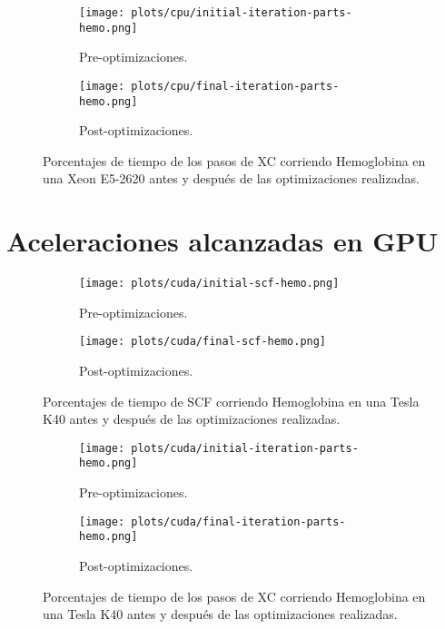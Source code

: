 \begin{figure}[htbp]
\centering
\begin{subfigure}[b]{\plotwidthtres}
   \texttt{[image: plots/cpu/initial-iteration-parts-hemo.png]}
   \caption{Pre-optimizaciones.}
   \label{fig:initial-cpu-parts}
 \end{subfigure}
 \begin{subfigure}[b]{\plotwidthtres}
   \texttt{[image: plots/cpu/final-iteration-parts-hemo.png]}
   \caption{Post-optimizaciones.}
   \label{fig:final-cpu-parts}
 \end{subfigure}
 \caption{Porcentajes de tiempo de los pasos de XC corriendo Hemoglobina en una Xeon E5-2620 antes y despu\'es de
 las optimizaciones realizadas.}
 \label{fig:cpu-parts}
\end{figure}

\section{Aceleraciones alcanzadas en GPU}
\label{resultados-cuda}

\begin{figure}[htbp]
\centering
\begin{subfigure}[b]{\plotwidthtres}
   \texttt{[image: plots/cuda/initial-scf-hemo.png]}
   \caption{Pre-optimizaciones.}
   \label{fig:initial-cuda-scf}
 \end{subfigure}
 \begin{subfigure}[b]{\plotwidthtres}
   \texttt{[image: plots/cuda/final-scf-hemo.png]}
   \caption{Post-optimizaciones.}
   \label{fig:final-cuda-scf}
 \end{subfigure}
 \caption{Porcentajes de tiempo de SCF corriendo Hemoglobina en una Tesla K40 antes y despu\'es de
 las optimizaciones realizadas.}
 \label{fig:cuda-scf}
\end{figure}

\begin{figure}[htbp]
\centering
\begin{subfigure}[b]{\plotwidthtres}
   \texttt{[image: plots/cuda/initial-iteration-parts-hemo.png]}
   \caption{Pre-optimizaciones.}
   \label{fig:initial-cuda-parts}
 \end{subfigure}
 \begin{subfigure}[b]{\plotwidthtres}
   \texttt{[image: plots/cuda/final-iteration-parts-hemo.png]}
   \caption{Post-optimizaciones.}
   \label{fig:final-cuda-parts}
 \end{subfigure}
 \caption{Porcentajes de tiempo de los pasos de XC corriendo Hemoglobina en una Tesla K40 antes y despu\'es de
 las optimizaciones realizadas.}
 \label{fig:cuda-parts}
\end{figure}

